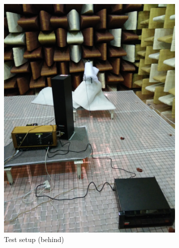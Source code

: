 \begin{figure}[H]
\centering
\begin{subfigure}[t]{0.47\textwidth}
	\centering
	\includegraphics[width=1\textwidth]{figures/Test_setup_behind.jpg}
	\caption{Test setup (behind)}
	\label{fig:test_setup_behind_R}
\end{subfigure}
\hspace{6mm} 
\begin{subfigure}[t]{0.47\textwidth}
	\centering

\end{subfigure}
\end{figure}
